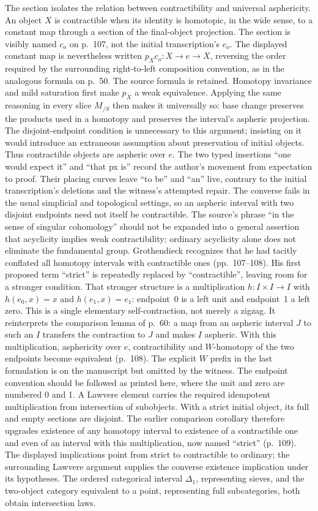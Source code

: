 \documentclass[10pt,oneside]{book}
\begin{document}
The section isolates the relation between contractibility and universal asphericity. An object $X$ is contractible when its identity is homotopic, in the wide sense, to a constant map through a section of the final-object projection. The section is visibly named $c_o$ on p.~107, not the initial transcription's $e_o$. The displayed constant map is nevertheless written $p_Xc_o:X\to e\to X$, reversing the order required by the surrounding right-to-left composition convention, as in the analogous formula on p.~50. The source formula is retained. Homotopy invariance and mild saturation first make $p_X$ a weak equivalence. Applying the same reasoning in every slice $M_{/S}$ then makes it universally so: base change preserves the products used in a homotopy and preserves the interval's aspheric projection. The disjoint-endpoint condition is unnecessary to this argument; insisting on it would introduce an extraneous assumption about preservation of initial objects. Thus contractible objects are aspheric over $e$. The two typed insertions ``one would expect it'' and ``that px is'' record the author's movement from expectation to proof. Their placing curves leave ``to be'' and ``an'' live, contrary to the initial transcription's deletions and the witness's attempted repair. The converse fails in the usual simplicial and topological settings, so an aspheric interval with two disjoint endpoints need not itself be contractible. The source's phrase ``in the sense of singular cohomology'' should not be expanded into a general assertion that acyclicity implies weak contractibility; ordinary acyclicity alone does not eliminate the fundamental group. Grothendieck recognizes that he had tacitly conflated all homotopy intervals with contractible ones (pp.~107--108). His first proposed term ``strict'' is repeatedly replaced by ``contractible'', leaving room for a stronger condition. That stronger structure is a multiplication $h:I\times I\to I$ with $h(e_0,x)=x$ and $h(e_1,x)=e_1$: endpoint~0 is a left unit and endpoint~1 a left zero. This is a single elementary self-contraction, not merely a zigzag. It reinterprets the comparison lemma of p.~60: a map from an aspheric interval $J$ to such an $I$ transfers the contraction to $J$ and makes $I$ aspheric. With this multiplication, asphericity over $e$, contractibility and $W$-homotopy of the two endpoints become equivalent (p.~108). The explicit $W$ prefix in the last formulation is on the manuscript but omitted by the witness. The endpoint convention should be followed as printed here, where the unit and zero are numbered 0 and 1. A Lawvere element carries the required idempotent multiplication from intersection of subobjects. With a strict initial object, its full and empty sections are disjoint. The earlier comparison corollary therefore upgrades existence of any homotopy interval to existence of a contractible one and even of an interval with this multiplication, now named ``strict'' (p.~109). The displayed implications point from strict to contractible to ordinary; the surrounding Lawvere argument supplies the converse existence implication under its hypotheses. The ordered categorical interval $\Delta_1$, representing sieves, and the two-object category equivalent to a point, representing full subcategories, both obtain intersection laws. 
\end{document}

